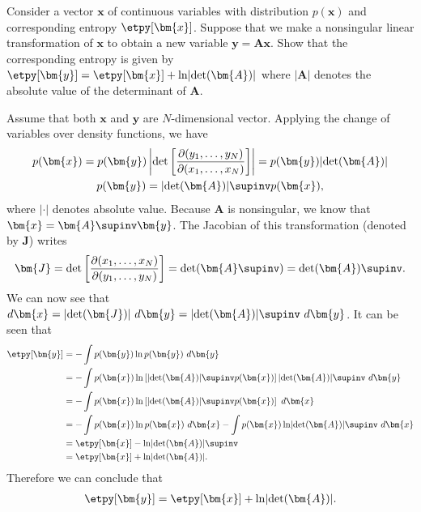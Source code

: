 \begin{question}{1.32}
	Consider a vector $\bm{x}$ of continuous variables with distribution $p(\bm{x})$ and corresponding entropy $\etpy[\bm{x}]$. Suppose that we make a nonsingular linear transformation of $\bm{x}$ to obtain a new variable $\bm{y} = \bm{Ax}$. Show that the corresponding entropy is given by $\etpy[\bm{y}] = \etpy[\bm{x}] + \ln \lvert \det(\bm{A}) \rvert$ where $\lvert \bm{A} \rvert$ denotes the absolute value of the determinant of $\bm{A}$.
\end{question}

\begin{answer}{}
	Assume that both $\bm{x}$ and $\bm{y}$ are $N$-dimensional vector. Applying the change of variables over density functions, we have
	\begin{gather}
		p(\bm{x}) = p(\bm{y}) \left \lvert \det \left[\frac{\partial (y_1, \ldots, y_N)}{\partial (x_1, \ldots, x_N)}\right]\right\rvert = p(\bm{y}) \lvert \det(\bm{A})\rvert\\
		p(\bm{y}) =  \lvert\det(\bm{A})\rvert\supinv p(\bm{x}),
	\end{gather}
	where $\lvert \cdot \rvert$ denotes absolute value. Because $\bm{A}$ is nonsingular, we know that $\bm{x} = \bm{A}\supinv\bm{y}$. The Jacobian of this transformation (denoted by $\bm{J}$) writes
	\begin{align}
		\bm{J} = \det\left[\frac{\partial (x_1, \ldots, x_N)}{\partial (y_1, \ldots, y_N)}\right] = \det (\bm{A}\supinv) = \det(\bm{A})\supinv.
	\end{align}
	We can now see that $d\bm{x} = \lvert \det(\bm{J}) \rvert \ d\bm{y} = \lvert\det(\bm{A})\rvert\supinv \ d\bm{y}$. It can be seen that
	\begin{align}
		\etpy[\bm{y}] &= -\int p(\bm{y}) \ln p(\bm{y})\ d\bm{y}\\
		&= -\int p(\bm{x}) \ln \left[ \lvert\det(\bm{A})\rvert\supinv p(\bm{x}) \right]  \lvert\det(\bm{A})\rvert\supinv\ d\bm{y}\\
		&= -\int p(\bm{x}) \ln \left[ \lvert\det(\bm{A})\rvert\supinv p(\bm{x}) \right]\ d\bm{x}\\
		&= -\int p(\bm{x}) \ln p(\bm{x})\ d\bm{x} -\int p(\bm{x}) \ln \lvert\det(\bm{A})\rvert\supinv\ d\bm{x}\\
		&= \etpy[\bm{x}] - \ln \lvert\det(\bm{A})\rvert\supinv\\
		&= \etpy[\bm{x}] + \ln \lvert\det(\bm{A})\rvert.
	\end{align}
	Therefore we can conclude that 
	\begin{align}
		\etpy[\bm{y}] = \etpy[\bm{x}] + \ln \lvert\det(\bm{A})\rvert.
	\end{align}
\end{answer}